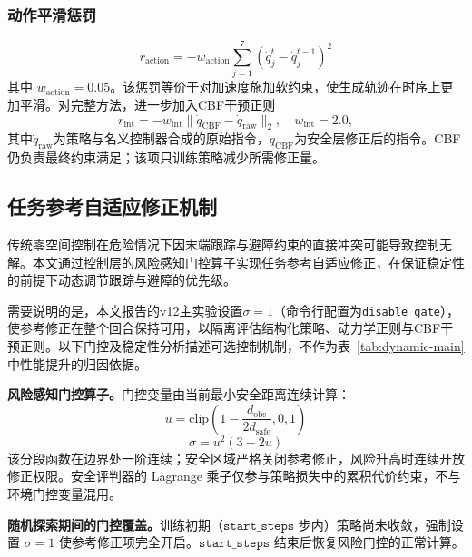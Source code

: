 \documentclass[10pt,conference]{IEEEtran}
\begin{document}
\subsubsection{动作平滑惩罚}
\begin{equation}
r_{\text{action}} = -w_{\text{action}} \sum_{j=1}^{7} (\dot{q}_j^t - \dot{q}_j^{t-1})^2
\label{eq:action_reward}
\end{equation}
其中 $w_{\text{action}}=0.05$。该惩罚等价于对加速度施加软约束，使生成轨迹在时序上更加平滑。对完整方法，进一步加入CBF干预正则
\begin{equation}
r_{\text{int}}=-w_{\text{int}}\|\dot q_{\text{CBF}}-\dot q_{\text{raw}}\|_2,
\quad w_{\text{int}}=2.0,
\label{eq:cbf_intervention_reward}
\end{equation}
其中$\dot q_{\text{raw}}$为策略与名义控制器合成的原始指令，$\dot q_{\text{CBF}}$为安全层修正后的指令。CBF仍负责最终约束满足；该项只训练策略减少所需修正量。

\subsection{任务参考自适应修正机制}
\label{sec:relaxation}

传统零空间控制在危险情况下因末端跟踪与避障约束的直接冲突可能导致控制无解。本文通过控制层的风险感知门控算子实现任务参考自适应修正，在保证稳定性的前提下动态调节跟踪与避障的优先级。

需要说明的是，本文报告的v12主实验设置$\sigma=1$（命令行配置为\texttt{disable\_gate}），使参考修正在整个回合保持可用，以隔离评估结构化策略、动力学正则与CBF干预正则。以下门控及稳定性分析描述可选控制机制，不作为表~\ref{tab:dynamic-main}中性能提升的归因依据。

\textbf{风险感知门控算子。}门控变量由当前最小安全距离连续计算：
\begin{equation}
u=\text{clip}\left(1-\frac{d_{\text{obs}}}{2d_{\text{safe}}},0,1\right)
\label{eq:lagrangian_update}
\end{equation}
\begin{equation}
\sigma=u^2(3-2u)
\label{eq:gate_operator2}
\end{equation}
该分段函数在边界处一阶连续；安全区域严格关闭参考修正，风险升高时连续开放修正权限。安全评判器的 Lagrange 乘子仅参与策略损失中的累积代价约束，不与环境门控变量混用。

\textbf{随机探索期间的门控覆盖。}训练初期（$\texttt{start\_steps}$ 步内）策略尚未收敛，强制设置 $\sigma = 1$ 使参考修正项完全开启。$\texttt{start\_steps}$ 结束后恢复风险门控的正常计算。
\end{document}
